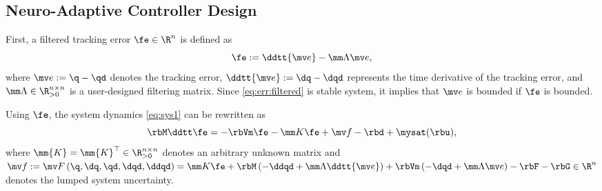 \documentclass[journal]{IEEEtran}
\begin{document}
\subsection{Neuro-Adaptive Controller Design}\label{sec:sub:NAC}

First, a filtered tracking error $\fe\in\R^n$ is defined as 
\begin{equation}
    \fe := \ddtt{\mv e}-\mm\Lambda \mv e
    ,
    \label{eq:err:filtered}
\end{equation}
where $\mv e := \q - \qd$ denotes the tracking error, $\ddtt{\mv e} := \dq - \dqd$ represents the time derivative of the tracking error, and $\mm\Lambda\in\R^{n\times n}_{>0}$ is a user-designed filtering matrix.
Since \eqref{eq:err:filtered} is stable system, it implies that $\mv e$ is bounded if $\fe$ is bounded.

Using $\fe$, the system dynamics \eqref{eq:sys1} can be rewritten as
\begin{equation}
    \rbM \ddtt\fe
    =
    -\rbVm \fe
    -\mm K \fe
    + \mv f
    -\rbd + \mysat(\rbu)
    ,
    \label{eq:sys:filtered}
\end{equation}
where $\mm{K}=\mm{K}^\top\in\R^{n\times n}_{>0}$ denotes an arbitrary unknown matrix and $
    \mv f:= \mv F
    \left(
        \q,\dq,\qd,\dqd,\ddqd
    \right)
    =
    \mm K \fe
    +\rbM
    \left(
        -\ddqd+\mm\Lambda\ddtt{\mv e}
    \right)
    +
    \rbVm
    \left(
        -\dqd+\mm\Lambda\mv e
    \right)
    -
    \rbF
    -
    \rbG
    \in\R^n
$ denotes the lumped system uncertainty.
\end{document}
